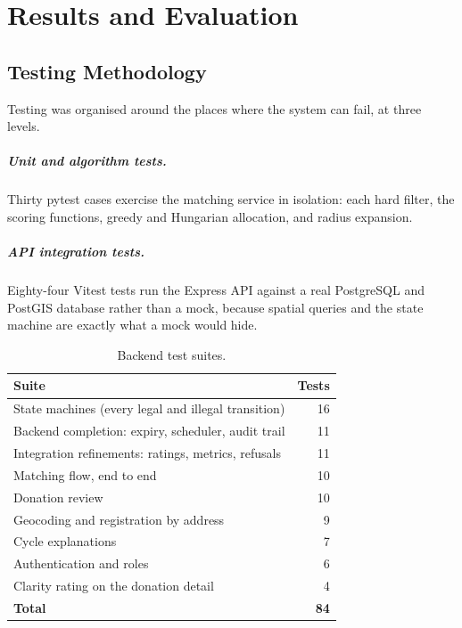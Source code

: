 \documentclass[11pt,a4paper]{report}
\begin{document}
\chapter{Results and Evaluation}

\section{Testing Methodology}

Testing was organised around the places where the system can fail, at three
levels.

\paragraph{Unit and algorithm tests.} Thirty pytest cases exercise the matching
service in isolation: each hard filter, the scoring functions, greedy and
Hungarian allocation, and radius expansion.

\paragraph{API integration tests.} Eighty-four Vitest tests run the Express API
against a real PostgreSQL and PostGIS database rather than a mock, because
spatial queries and the state machine are exactly what a mock would hide.

\begin{table}[H]
\centering
\small
\begin{tabular}{@{}lr@{}}
\toprule
\textbf{Suite} & \textbf{Tests} \\
\midrule
State machines (every legal and illegal transition) & 16 \\
Backend completion: expiry, scheduler, audit trail & 11 \\
Integration refinements: ratings, metrics, refusals & 11 \\
Matching flow, end to end & 10 \\
Donation review & 10 \\
Geocoding and registration by address & 9 \\
Cycle explanations & 7 \\
Authentication and roles & 6 \\
Clarity rating on the donation detail & 4 \\
\midrule
\textbf{Total} & \textbf{84} \\
\bottomrule
\end{tabular}
\caption{Backend test suites.}
\end{table}
\end{document}

